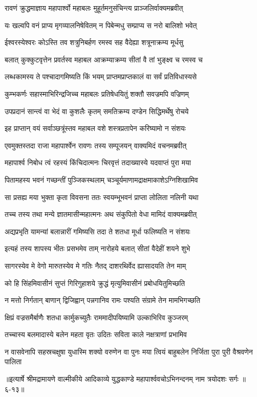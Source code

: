 
\twolineshloka
{रावणं क्रुद्धमाज्ञाय महापार्श्वो महाबलः}
{मुहूर्तमनुसंचिन्त्य प्राञ्जलिर्वाक्यमब्रवीत्} %

\twolineshloka
{यः खल्वपि वनं प्राप्य मृगव्यालनिषेवितम्}
{न पिबेन्मधु सम्प्राप्य स नरो बालिशो भवेत्} %

\twolineshloka
{ईश्वरस्येश्वरः कोऽस्ति तव शत्रुनिबर्हण}
{रमस्व सह वैदेह्या शत्रूनाक्रम्य मूर्धसु} %

\twolineshloka
{बलात् कुक्कुटवृत्तेन प्रवर्तस्व महाबल}
{आक्रम्याक्रम्य सीतां वै तां भुङ्क्ष्व च रमस्व च} %

\twolineshloka
{लब्धकामस्य ते पश्चादागमिष्यति किं भयम्}
{प्राप्तमप्राप्तकालं वा सर्वं प्रतिविधास्यसे} %

\twolineshloka
{कुम्भकर्णः सहास्माभिरिन्द्रजिच्च महाबलः}
{प्रतिषेधयितुं शक्तौ सवज्रमपि वज्रिणम्} %

\twolineshloka
{उपप्रदानं सान्त्वं वा भेदं वा कुशलैः कृतम्}
{समतिक्रम्य दण्डेन सिद्धिमर्थेषु रोचये} %

\twolineshloka
{इह प्राप्तान् वयं सर्वाञ्छत्रूंस्तव महाबल}
{वशे शस्त्रप्रतापेन करिष्यामो न संशयः} %

\twolineshloka
{एवमुक्तस्तदा राजा महापार्श्वेन रावणः}
{तस्य सम्पूजयन् वाक्यमिदं वचनमब्रवीत्} %

\twolineshloka
{महापार्श्व निबोध त्वं रहस्यं किंचिदात्मनः}
{चिरवृत्तं तदाख्यास्ये यदवाप्तं पुरा मया} %

\twolineshloka
{पितामहस्य भवनं गच्छन्तीं पुञ्जिकस्थलाम्}
{चञ्चूर्यमाणामद्राक्षमाकाशेऽग्निशिखामिव} %

\twolineshloka
{सा प्रसह्य मया भुक्ता कृता विवसना ततः}
{स्वयम्भूभवनं प्राप्ता लोलिता नलिनी यथा} %

\twolineshloka
{तच्च तस्य तथा मन्ये ज्ञातमासीन्महात्मनः}
{अथ संकुपितो वेधा मामिदं वाक्यमब्रवीत्} %

\twolineshloka
{अद्यप्रभृति यामन्यां बलान्नारीं गमिष्यसि}
{तदा ते शतधा मूर्धा फलिष्यति न संशयः} %

\twolineshloka
{इत्यहं तस्य शापस्य भीतः प्रसभमेव ताम्}
{नारोहये बलात् सीतां वैदेहीं शयने शुभे} %

\twolineshloka
{सागरस्येव मे वेगो मारुतस्येव मे गतिः}
{नैतद् दाशरथिर्वेद ह्यासादयति तेन माम्} %

\twolineshloka
{को हि सिंहमिवासीनं सुप्तं गिरिगुहाशये}
{क्रुद्धं मृत्युमिवासीनं प्रबोधयितुमिच्छति} %

\twolineshloka
{न मत्तो निर्गतान् बाणान् द्विजिह्वान् पन्नगानिव}
{रामः पश्यति संग्रामे तेन मामभिगच्छति} %

\twolineshloka
{क्षिप्रं वज्रसमैर्बाणैः शतधा कार्मुकच्युतैः}
{राममादीपयिष्यामि उल्काभिरिव कुञ्जरम्} %

\twolineshloka
{तच्चास्य बलमादास्ये बलेन महता वृतः}
{उदितः सविता काले नक्षत्राणां प्रभामिव} %

\twolineshloka
{न वासवेनापि सहस्रचक्षुषा युधास्मि शक्यो वरुणेन वा पुनः}
{मया त्वियं बाहुबलेन निर्जिता पुरा पुरी वैश्रवणेन पालिता} %


॥इत्यार्षे श्रीमद्रामायणे वाल्मीकीये आदिकाव्ये युद्धकाण्डे महापार्श्ववचोऽभिनन्दनम् नाम त्रयोदशः सर्गः ॥६-१३॥
